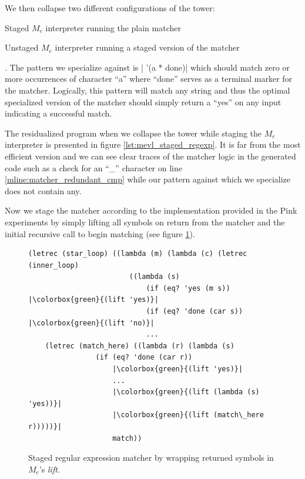 \documentclass[a4paper,12pt,twoside,openright]{report}
\theoremstyle{definition}
\newcommand{\mevl}{$M_{e}$}
\begin{document}
We then collapse two different configurations of the tower:
\begin{enumerate*}[label=(\arabic*)]
    \item Staged \mevl{} interpreter running the plain matcher
    \item Unstaged \mevl{} interpreter running a staged version of the matcher
\end{enumerate*}. The pattern we specialize against is
|    '(a * done)|
which should match zero or more occurrences of character ``a'' where ``done'' serves as a terminal marker for the matcher. Logically, this pattern will match any string and thus the optimal specialized version of the matcher should simply return a ``yes'' on any input indicating a successful match.

The residualized program when we collapse the tower while staging the \mevl{} interpreter is presented in figure \ref{lst:mevl_staged_regexp}. It is far from the most efficient version and we can see clear traces of the matcher logic in the generated code such as a check for an ``\_'' character on line \ref{mline:matcher_redundant_cmp} while our pattern against which we specialize does not contain any.

Now we stage the matcher according to the implementation provided in the Pink experiments \cite{amin2017collapsing} by simply lifting all symbols on return from the matcher and the initial recursive call to begin matching (see figure \ref{lst:regexp_staged}).

\begin{figure}[htp!]
    \centering
    \begin{verbatim}
(letrec (star_loop) ((lambda (m) (lambda (c) (letrec (inner_loop)
                        ((lambda (s)
                            (if (eq? 'yes (m s)) |\colorbox{green}{(lift 'yes)}|
                            (if (eq? 'done (car s)) |\colorbox{green}{(lift 'no)}|
                            ...
    (letrec (match_here) ((lambda (r) (lambda (s)
                (if (eq? 'done (car r))
                    |\colorbox{green}{(lift 'yes)}|
                    ...
                    |\colorbox{green}{(lift (lambda (s) 'yes))}|
                    |\colorbox{green}{(lift (match\_here r)))))}|
                    match))
    \end{verbatim}
    \caption{Staged regular expression matcher by wrapping returned symbols in \mevl's \textit{lift}.}
    \label{lst:regexp_staged}
\end{figure}
\end{document}
